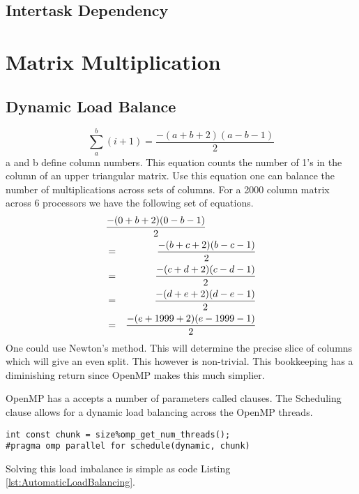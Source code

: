 \documentclass[journal,10pt,draftcls]{IEEEtran}
\begin{document}
\subsection{Intertask Dependency}


\section{Matrix Multiplication}

\subsection{Dynamic Load Balance}

\begin{equation}
\sum\limits_{a}^b (i + 1) = \frac{-(a + b + 2)(a - b -1)}{2}
\end{equation}
a and b define column numbers.  This equation counts the number of 1's in the 
column of an upper triangular matrix. Use this equation one can balance the number of 
multiplications across sets of columns.  For a 2000 column matrix across 6 processors 
we have the following set of equations.
\begin{eqnarray}
\lefteqn{\frac{-(0 + b + 2)(0 - b -1)}{2}} \\
& = & \frac{-(b + c + 2)(b - c -1)}{2} \\
& = & \frac{-(c + d + 2)(c - d -1)}{2} \\
& = & \frac{-(d + e + 2)(d - e -1)}{2} \\
& = & \frac{-(e + 1999 + 2)(e - 1999 -1)}{2}
\end{eqnarray}
One could use Newton's method. This will determine the precise slice of columns which 
will give an even split. This however is non-trivial. This bookkeeping has a diminishing 
return since OpenMP makes this much simplier.

OpenMP has a accepts a number of parameters called clauses. The Scheduling clause allows
for a dynamic load balancing across the OpenMP threads. 

\label{lst:AutomaticLoadBalancing}
\begin{lstlisting}
int const chunk = size%omp_get_num_threads();
#pragma omp parallel for schedule(dynamic, chunk)
\end{lstlisting}
Solving this load imbalance is simple as code Listing \ref{lst:AutomaticLoadBalancing}.
\end{document}
